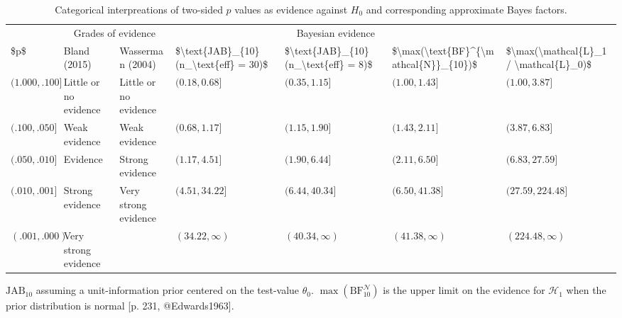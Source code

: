 \documentclass[
  man,
  floatsintext,
  longtable,
  nolmodern,
  notxfonts,
  notimes,
  colorlinks=true,linkcolor=blue,citecolor=blue,urlcolor=blue]{apa7}
\begin{document}
\begin{table}

{\caption{{Categorical interpreations of two-sided \(p\) values as
evidence against \(H_0\) and corresponding approximate Bayes
factors.}{\label{tbl-evidence-categories}}}
\vspace{-20pt}}

\fontsize{12.0pt}{14.4pt}\selectfont
\begin{tabular*}{\linewidth}{@{\extracolsep{\fill}}lllllll}
\toprule
 & \multicolumn{2}{c}{Grades of evidence} & \multicolumn{3}{c}{Bayesian evidence} &  \\ 
\cmidrule(lr){2-3} \cmidrule(lr){4-6}
\$p\$ & Bland (2015) & Wasserman (2004) & \$\textbackslash{}text\{JAB\}\_\{10\}(n\_\textbackslash{}text\{eff\} = 30)\$ & \$\textbackslash{}text\{JAB\}\_\{10\}(n\_\textbackslash{}text\{eff\} = 8)\$ & \$\textbackslash{}max(\textbackslash{}text\{BF\}\textasciicircum{}\{\textbackslash{}mathcal\{N\}\}\_\{10\})\$ & \$\textbackslash{}max(\textbackslash{}mathcal\{L\}\_1 / \textbackslash{}mathcal\{L\}\_0)\$ \\ 
\midrule\addlinespace[2.5pt]
\((1.000, .100]\) & Little or no evidence & Little or no evidence & \((0.18, 0.68]\) & \((0.35, 1.15]\) & \((1.00, 1.43]\) & \((1.00, 3.87]\) \\ 
\((.100, .050]\) & Weak evidence & Weak evidence & \((0.68, 1.17]\) & \((1.15, 1.90]\) & \((1.43, 2.11]\) & \((3.87, 6.83]\) \\ 
\((.050, .010]\) & Evidence & Strong evidence & \((1.17, 4.51]\) & \((1.90, 6.44]\) & \((2.11, 6.50]\) & \((6.83, 27.59]\) \\ 
\((.010, .001]\) & Strong evidence & Very strong evidence & \((4.51, 34.22]\) & \((6.44, 40.34]\) & \((6.50, 41.38]\) & \((27.59, 224.48]\) \\ 
\((.001, .000)\) & Very strong evidence &  & \((34.22, \infty)\) & \((40.34, \infty)\) & \((41.38, \infty)\) & \((224.48, \infty)\) \\ 
\bottomrule
\end{tabular*}
\begin{minipage}{\linewidth}
\(\text{JAB}_{10}\) assuming a unit-information prior centered on the test-value \(\theta_0\). \(\max(\text{BF}^{\mathcal{N}}_{10})\) is the upper limit on the evidence for \(\mathcal{H}_1\) when the prior distribution is normal {[}p. 231, @Edwards1963{]}.\\
\end{minipage}

\end{table}
\end{document}
